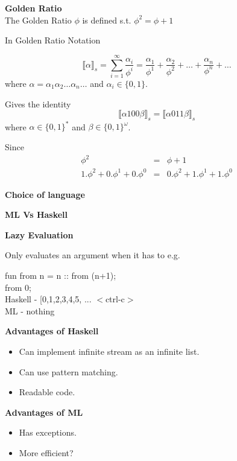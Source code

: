\documentclass{csslides}\raggedright
\begin{document}
\begin{slide}{}
{\bf Golden Ratio} \\
The Golden Ratio $\phi$ is defined s.t. $\phi^{2}=\phi+1$

In Golden Ratio Notation

\[ \llbracket \alpha \rrbracket_s =\sum_{i=1}^{\infty} \frac{\alpha_i}{\phi^{i}} = \frac{\alpha_1}{\phi^{1}} + \frac{\alpha_2}{\phi^{2}} + \ldots + \frac{\alpha_n}{\phi^{n}} +\ldots \]
where $ \alpha = \alpha_1 \alpha_2 \ldots \alpha_n \ldots$ and
$ \alpha_i \in \{0, 1\}.$

Gives the identity
\[ \llbracket \alpha 100 \beta \rrbracket_s = \llbracket \alpha 011 \beta \rrbracket_s \]
where $\alpha \in \{0,1\}^{*}$ and $\beta \in \{0,1\}^{\omega}$.

Since
\[ \begin{array}{rcl}
\phi^2 & = & \phi + 1 \\
1.\phi^2 + 0.\phi^1 + 0.\phi^0 & = & 0.\phi^2 + 1.\phi^1 + 1.\phi^0
\end{array} \]

\end{slide}

\begin{slide}{}
{\bf Choice of language}
\vfill

\begin{center}
{\bf ML Vs Haskell}
\end{center}

{\bf Lazy Evaluation}

Only evaluates an argument when it has to e.g.

fun from n = n :: from (n+1); \\


from 0; \\
Haskell - [0,1,2,3,4,5, ... $<$ctrl-c$>$ \\
ML  - nothing

{\bf Advantages of Haskell}
\begin{itemize}
\item Can implement infinite stream as an infinite list.
\item Can use pattern matching.
\item Readable code.
\end{itemize}

{\bf Advantages of ML}
\begin{itemize}
\item Has exceptions.
\item More efficient?
\end{itemize}
\end{slide}
\end{document}
